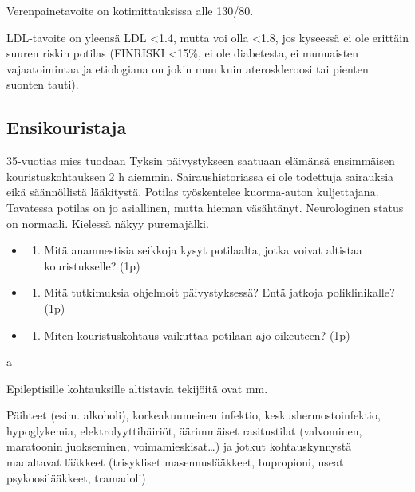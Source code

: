 \documentclass[
]{book}
\providecommand{\tightlist}{%
  \setlength{\itemsep}{0pt}\setlength{\parskip}{0pt}}
\begin{document}
Verenpainetavoite on kotimittauksissa alle 130/80.

LDL-tavoite on yleensä LDL \textless1.4, mutta voi olla \textless1.8, jos kyseessä ei ole erittäin suuren riskin potilas (FINRISKI \textless15\%, ei ole diabetesta, ei munuaisten vajaatoimintaa ja etiologiana on jokin muu kuin ateroskleroosi tai pienten suonten tauti).

\subsection{Ensikouristaja}\label{ensikouristaja}

35-vuotias mies tuodaan Tyksin päivystykseen saatuaan elämänsä ensimmäisen kouristuskohtauksen 2 h aiemmin. Sairaushistoriassa ei ole todettuja sairauksia eikä säännöllistä lääkitystä. Potilas työskentelee kuorma-auton kuljettajana. Tavatessa potilas on jo asiallinen, mutta hieman väsähtänyt. Neurologinen status on normaali. Kielessä näkyy puremajälki.

\begin{itemize}
\tightlist
\item
  \begin{enumerate}
  \def\labelenumi{\alph{enumi}.}
  \tightlist
  \item
    Mitä anamnestisia seikkoja kysyt potilaalta, jotka voivat altistaa kouristukselle? (1p)
  \end{enumerate}
\item
  \begin{enumerate}
  \def\labelenumi{\alph{enumi}.}
  \setcounter{enumi}{1}
  \tightlist
  \item
    Mitä tutkimuksia ohjelmoit päivystyksessä? Entä jatkoja poliklinikalle? (1p)
  \end{enumerate}
\item
  \begin{enumerate}
  \def\labelenumi{\alph{enumi}.}
  \setcounter{enumi}{2}
  \tightlist
  \item
    Miten kouristuskohtaus vaikuttaa potilaan ajo-oikeuteen? (1p)
  \end{enumerate}
\end{itemize}

a

Epileptisille kohtauksille altistavia tekijöitä ovat mm.

Päihteet (esim. alkoholi), korkeakuumeinen infektio, keskushermostoinfektio, hypoglykemia, elektrolyyttihäiriöt, äärimmäiset rasitustilat (valvominen, maratoonin juokseminen, voimamieskisat\ldots) ja jotkut kohtauskynnystä madaltavat lääkkeet (trisykliset masennuslääkkeet, bupropioni, useat psykoosilääkkeet, tramadoli)
\end{document}
